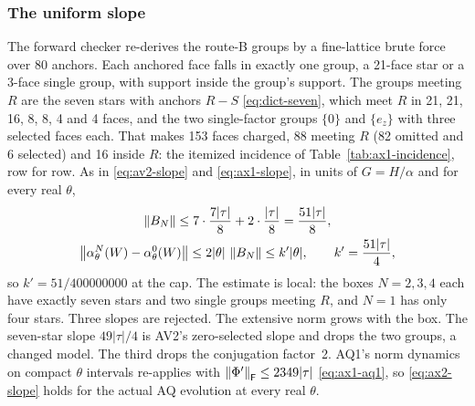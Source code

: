 \subsubsection{The uniform slope}
\label{sec:ax2-slope}
The forward checker re-derives the route-B groups by a fine-lattice brute
force over 80 anchors. Each anchored face falls in exactly one group, a
21-face star or a 3-face single group, with support inside the group's
support. The groups meeting $R$ are the seven stars with anchors $R-S$
\eqref{eq:dict-seven}, which meet $R$ in 21, 21, 16, 8, 8, 4 and 4 faces, and
the two single-factor groups $\{0\}$ and $\{e_z\}$ with three selected faces
each. That makes 153 faces charged, 88 meeting $R$ (82 omitted and 6 selected)
and 16 inside $R$: the itemized incidence of Table~\ref{tab:ax1-incidence},
row for row. As in \eqref{eq:av2-slope} and \eqref{eq:ax1-slope}, in units of
$G=H/\alpha$ and for every real $\theta$,
\begin{equation}
 \begin{gathered}
 \left\lVert B_N\right\rVert\le7\cdot\frac{7|\tau|}8+2\cdot\frac{|\tau|}8=\frac{51|\tau|}8,\\
 \left\lVert\alpha^N_\theta(W)-\alpha^0_\theta(W)\right\rVert\le2|\theta|\,\left\lVert B_N\right\rVert\le k'|\theta|,
 \qquad k'=\frac{51|\tau|}4 ,
 \end{gathered}
 \label{eq:ax2-slope}
\end{equation}
so $k'=51/400000000$ at the cap. The estimate is local: the boxes $N=2,3,4$
each have exactly seven stars and two single groups meeting $R$, and $N=1$
has only four stars. Three slopes are rejected. The extensive norm grows with
the box. The seven-star slope $49|\tau|/4$ is AV2's zero-selected slope and
drops the two groups, a changed model. The third drops the conjugation
factor~2. AQ1's norm dynamics on compact $\theta$ intervals re-applies with
$\left\lVert\Phi'\right\rVert_{\mathsf F}\le2349|\tau|$ \eqref{eq:ax1-aq1}, so
\eqref{eq:ax2-slope} holds for the actual AQ evolution at every real $\theta$.

